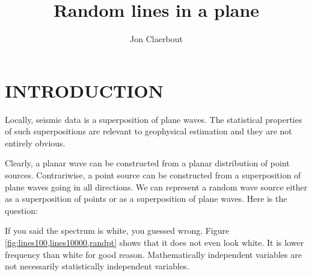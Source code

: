 

\title{Random lines in a plane}

\author{Jon Claerbout}
\def\eq{\quad =\quad}


\maketitle

\section{INTRODUCTION}

Locally, seismic data is a superposition of plane waves.
The statistical properties of such superpositions
are relevant to geophysical estimation
and they are not entirely obvious.

\par
Clearly, a planar wave can be constructed from a planar
distribution of point sources.
Contrariwise, a point source can be constructed from
a superposition of plane waves going in all directions.
We can represent a random wave source either as a superposition
of points or as a superposition of plane waves.
Here is the question:\\



If you said the spectrum is white, you guessed wrong.
Figure \ref{fig:lines100,lines10000,randpt} shows that it does not
even look white.
It is lower frequency than white for good reason.
Mathematically independent variables
are not necessarily statistically independent variables.

